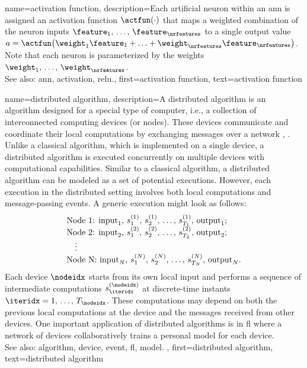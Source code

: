 {name={activation function},
	description={Each artificial neuron within an \gls{ann} is 
		assigned an \gls{activation} \gls{function} $\actfun(\cdot)$ that maps a weighted 
		combination of the neuron inputs $\feature_{1}, \,\ldots, \,\feature_{\nrfeatures}$ 
		to a single output value $a = \actfun\big(\weight_{1} \feature_{1}+\ldots+\weight_{\nrfeatures} \feature_{\nrfeatures} \big)$. 
		Note that each neuron is parameterized by the \gls{weights} $\weight_{1}, \,\ldots, \,\weight_{\nrfeatures}$.
					\\ 
		See also: \gls{ann}, \gls{activation}, \gls{relu}.},
	first={activation function},
	text={activation function} 
}

{name={distributed algorithm},
	description={A distributed \gls{algorithm} is an \gls{algorithm} designed for 
		a special type of computer, i.e., a collection of interconnected computing devices (or nodes). 
		These devices communicate and coordinate their local computations by exchanging 
		messages over a network \cite{IntroDistAlg}, \cite{ParallelDistrBook}. Unlike a classical \gls{algorithm}, 
		which is implemented on a single \gls{device}, a distributed \gls{algorithm} is 
		executed concurrently on multiple \glspl{device} with computational capabilities. 
		Similar to a classical \gls{algorithm}, a distributed \gls{algorithm} can be modeled as a 
		set of potential executions. However, each execution in the distributed setting involves 
		both local computations and message-passing \glspl{event}. A generic execution might look as 
		follows:
		\[
		\begin{array}{l}
			\text{Node 1: } {\rm input}_1, \,s_1^{(1)}, \,s_2^{(1)}, \,\ldots, \,s_{T_1}^{(1)}, \,{\rm output}_1; \\
			\text{Node 2: } {\rm input}_2, \,s_1^{(2)}, \,s_2^{(2)}, \,\ldots, \,s_{T_2}^{(2)}, \,{\rm output}_2; \\
			\quad \vdots \\
			\text{Node N: } {\rm input}_N, \,s_1^{(N)}, \,s_2^{(N)}, \,\ldots, \,s_{T_N}^{(N)}, \,{\rm output}_N.
		\end{array}
		\]
		Each \gls{device} $\nodeidx$ starts from its own local input and performs a sequence of 
		intermediate computations $s_{\iteridx}^{(\nodeidx)}$ at discrete-time instants $\iteridx = 1, \,\dots, \,T_\nodeidx$. 
		These computations may depend on both the previous local computations at the \gls{device} 
		and the messages received from other \glspl{device}. One important application of distributed 
		\glspl{algorithm} is in \gls{fl} where a network of \glspl{device} collaboratively trains a personal \gls{model} 
		for each \gls{device}. 
					\\ 
		See also: \gls{algorithm}, \gls{device}, \gls{event}, \gls{fl}, \gls{model}.
		},
	first={distributed algorithm}, 
	text={distributed algorithm}
}


